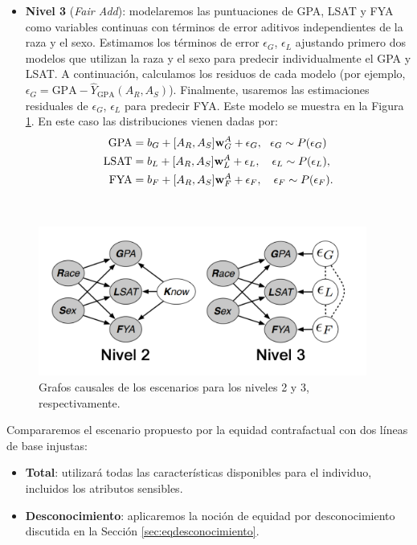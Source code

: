 \documentclass[oneside,openright,titlepage,numbers=noenddot,openany,headinclude,footinclude=true,
cleardoublepage=empty,abstractoff,BCOR=5mm,paper=a4,fontsize=12pt,main=spanish]{scrreprt}
\begin{document}
\begin{itemize}
    \item \textbf{Nivel 3} (\textit{Fair Add}): modelaremos las puntuaciones de GPA, LSAT y FYA como variables continuas con términos de error aditivos independientes de la raza y el sexo. Estimamos los términos de error $\epsilon_G$, $\epsilon_L$ ajustando primero dos modelos que utilizan la raza y el sexo para predecir individualmente el GPA y LSAT. A continuación, calculamos los residuos de cada modelo (por ejemplo, $\epsilon_G =\text{GPA}-\hat{Y}_{\text{GPA}}(A_R, A_S)$). Finalmente, usaremos las estimaciones residuales de $\epsilon_G$, $\epsilon_L$ para predecir FYA. Este modelo se muestra en la Figura \ref{fig:practicausales}. En este caso las distribuciones vienen dadas por:
    \begin{equation*}
    \begin{split}
        \text{GPA} &= b_G+[A_R,A_S] \nm{w}^A_G +\epsilon_G, \ \ \epsilon_G \sim P(\epsilon_G)\\
        \text{LSAT} &= b_L+[A_R,A_S] \nm{w}^A_L +\epsilon_L, \quad \epsilon_L \sim P(\epsilon_L),\\
        \text{FYA}&= b_F+[A_R,A_S] \nm{w}^A_F +\epsilon_F, \quad \epsilon_F \sim P(\epsilon_F).
    \end{split}
    \end{equation*}
\end{itemize}\

\begin{figure}[h]
	\centering
	\includegraphics[width=10.8cm]{causales_pract.png}
	\caption{Grafos causales de los escenarios para los niveles 2 y 3, respectivamente.}
    \label{fig:practicausales}
\end{figure}

Compararemos el escenario propuesto por la equidad contrafactual con dos líneas de base injustas: 

\begin{itemize}
    \item \textbf{Total}: utilizará todas las características disponibles para el individuo, incluidos los atributos sensibles.
    \item \textbf{Desconocimiento}: aplicaremos la noción de equidad por desconocimiento discutida en la Sección \ref{sec:eqdesconocimiento}.
\end{itemize} 
\end{document}
